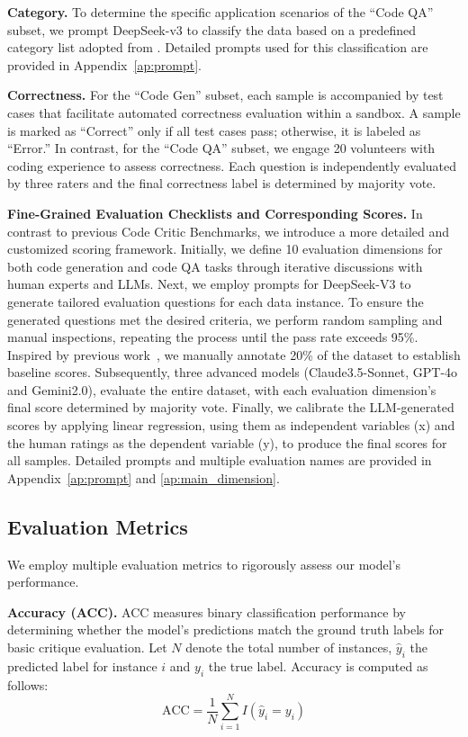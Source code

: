 \documentclass[11pt, a4paper, logo, copyright, nonumbering, amsart]{map}
\begin{document}
\begin{CJK*}{UTF8}{gbsn}
\noindent \textbf{Category.} To determine the specific application scenarios of the ``Code QA'' subset, we prompt DeepSeek-v3 to classify the data based on a predefined category list adopted from \cite{liu2024fullstack}. Detailed prompts used for this classification are provided in Appendix~\ref{ap:prompt}.

\noindent \textbf{Correctness.} For the ``Code Gen'' subset, each sample is accompanied by test cases that facilitate automated correctness evaluation within a sandbox. A sample is marked as ``Correct'' only if all test cases pass; otherwise, it is labeled as ``Error.'' In contrast, for the ``Code QA'' subset, we engage 20 volunteers with coding experience to assess correctness. Each question is independently evaluated by three raters and the final correctness label is determined by majority vote.

\noindent \textbf{Fine-Grained Evaluation Checklists and Corresponding Scores.} In contrast to previous Code Critic Benchmarks, we introduce a more detailed and customized scoring framework. Initially, we define 10 evaluation dimensions for both code generation and code QA tasks through iterative discussions with human experts and LLMs. Next, we employ prompts for DeepSeek-V3 to generate tailored evaluation questions for each data instance. To ensure the generated questions met the desired criteria, we perform random sampling and manual inspections, repeating the process until the pass rate exceeds 95\%. Inspired by previous work~\cite{que2024hellobench}, we manually annotate 20\% of the dataset to establish baseline scores. Subsequently, three advanced models (Claude3.5-Sonnet, GPT-4o and Gemini2.0), evaluate the entire dataset, with each evaluation dimension’s final score determined by majority vote. Finally, we calibrate the LLM-generated scores by applying linear regression, using them as independent variables (x) and the human ratings as the dependent variable (y), to produce the final scores for all samples. Detailed prompts and multiple evaluation names are provided in Appendix~\ref{ap:prompt} and \ref{ap:main_dimension}.

\subsection{Evaluation Metrics}

We employ multiple evaluation metrics to rigorously assess our model's performance.

\noindent \textbf{Accuracy (ACC).} ACC measures binary classification performance by determining whether the model's predictions match the ground truth labels for basic critique evaluation. Let $N$ denote the total number of instances, $\hat{y}_i$ the predicted label for instance $i$ and $y_i$ the true label. Accuracy is computed as follows:
\begin{equation}
    \text{ACC} = \frac{1}{N} \sum_{i=1}^{N} I(\hat{y}_i = y_i)
\end{equation}


\end{CJK*}
\end{document}
